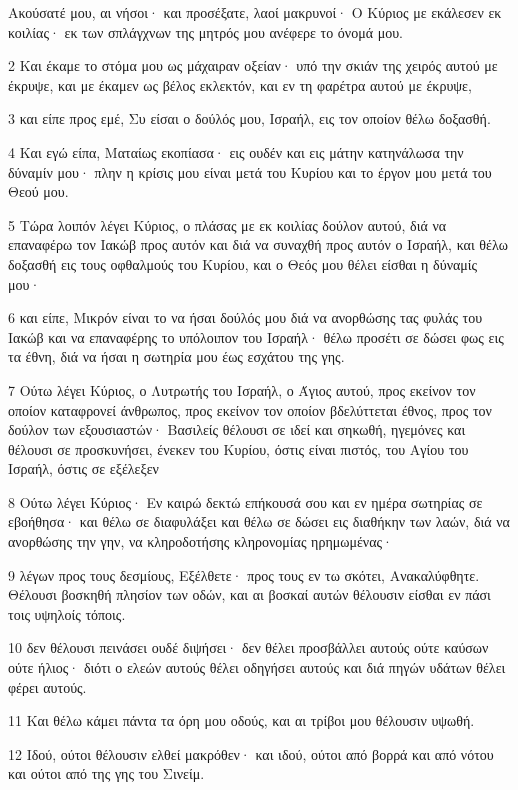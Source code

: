 \par Ακούσατέ μου, αι νήσοι· και προσέξατε, λαοί μακρυνοί· Ο Κύριος με εκάλεσεν εκ κοιλίας· εκ των σπλάγχνων της μητρός μου ανέφερε το όνομά μου.
\par 2 Και έκαμε το στόμα μου ως μάχαιραν οξείαν· υπό την σκιάν της χειρός αυτού με έκρυψε, και με έκαμεν ως βέλος εκλεκτόν, και εν τη φαρέτρα αυτού με έκρυψε,
\par 3 και είπε προς εμέ, Συ είσαι ο δούλός μου, Ισραήλ, εις τον οποίον θέλω δοξασθή.
\par 4 Και εγώ είπα, Ματαίως εκοπίασα· εις ουδέν και εις μάτην κατηνάλωσα την δύναμίν μου· πλην η κρίσις μου είναι μετά του Κυρίου και το έργον μου μετά του Θεού μου.
\par 5 Τώρα λοιπόν λέγει Κύριος, ο πλάσας με εκ κοιλίας δούλον αυτού, διά να επαναφέρω τον Ιακώβ προς αυτόν και διά να συναχθή προς αυτόν ο Ισραήλ, και θέλω δοξασθή εις τους οφθαλμούς του Κυρίου, και ο Θεός μου θέλει είσθαι η δύναμίς μου·
\par 6 και είπε, Μικρόν είναι το να ήσαι δούλός μου διά να ανορθώσης τας φυλάς του Ιακώβ και να επαναφέρης το υπόλοιπον του Ισραήλ· θέλω προσέτι σε δώσει φως εις τα έθνη, διά να ήσαι η σωτηρία μου έως εσχάτου της γης.
\par 7 Ούτω λέγει Κύριος, ο Λυτρωτής του Ισραήλ, ο Άγιος αυτού, προς εκείνον τον οποίον καταφρονεί άνθρωπος, προς εκείνον τον οποίον βδελύττεται έθνος, προς τον δούλον των εξουσιαστών· Βασιλείς θέλουσι σε ιδεί και σηκωθή, ηγεμόνες και θέλουσι σε προσκυνήσει, ένεκεν του Κυρίου, όστις είναι πιστός, του Αγίου του Ισραήλ, όστις σε εξέλεξεν
\par 8 Ούτω λέγει Κύριος· Εν καιρώ δεκτώ επήκουσά σου και εν ημέρα σωτηρίας σε εβοήθησα· και θέλω σε διαφυλάξει και θέλω σε δώσει εις διαθήκην των λαών, διά να ανορθώσης την γην, να κληροδοτήσης κληρονομίας ηρημωμένας·
\par 9 λέγων προς τους δεσμίους, Εξέλθετε· προς τους εν τω σκότει, Ανακαλύφθητε. Θέλουσι βοσκηθή πλησίον των οδών, και αι βοσκαί αυτών θέλουσιν είσθαι εν πάσι τοις υψηλοίς τόποις.
\par 10 δεν θέλουσι πεινάσει ουδέ διψήσει· δεν θέλει προσβάλλει αυτούς ούτε καύσων ούτε ήλιος· διότι ο ελεών αυτούς θέλει οδηγήσει αυτούς και διά πηγών υδάτων θέλει φέρει αυτούς.
\par 11 Και θέλω κάμει πάντα τα όρη μου οδούς, και αι τρίβοι μου θέλουσιν υψωθή.
\par 12 Ιδού, ούτοι θέλουσιν ελθεί μακρόθεν· και ιδού, ούτοι από βορρά και από νότου και ούτοι από της γης του Σινείμ.

